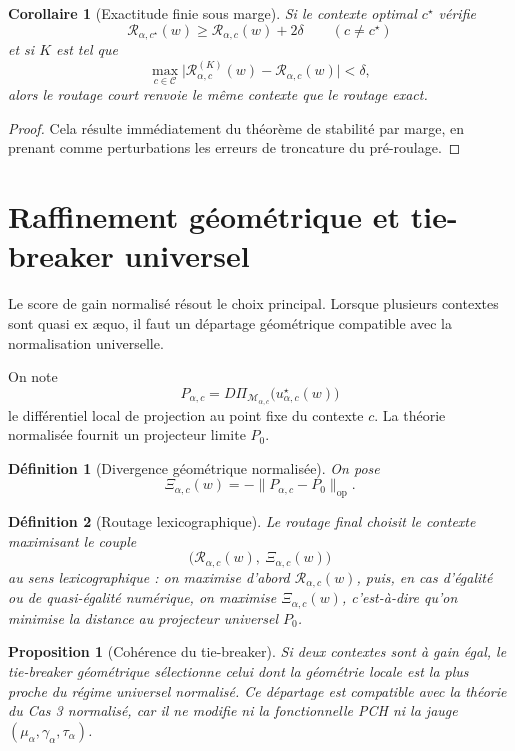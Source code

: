 \documentclass[11pt,a4paper]{article}
\newtheorem{definition}{Définition}[section]
\newtheorem{proposition}{Proposition}[section]
\newtheorem{corollary}{Corollaire}[section]
\DeclareMathOperator{\op}{op}
\newcommand{\Mcal}{\mathcal M}
\newcommand{\Ccal}{\mathcal C}
\begin{document}
\begin{corollary}[Exactitude finie sous marge]
\label{cor:finite-exactness}
Si le contexte optimal \(c^\star\) vérifie
\[
\mathcal R_{\alpha,c^\star}(w)\ge \mathcal R_{\alpha,c}(w)+2\delta
\qquad(c\neq c^\star)
\]
et si \(K\) est tel que
\[
\max_{c\in\Ccal}\bigl|\mathcal R^{(K)}_{\alpha,c}(w)-\mathcal R_{\alpha,c}(w)\bigr|<\delta,
\]
alors le routage court renvoie le même contexte que le routage exact.
\end{corollary}

\begin{proof}
Cela résulte immédiatement du théorème de stabilité par marge, en prenant comme perturbations les erreurs de troncature du pré-roulage.
\end{proof}

\section{Raffinement géométrique et tie-breaker universel}

Le score de gain normalisé résout le choix principal.
Lorsque plusieurs contextes sont quasi ex æquo, il faut un départage géométrique compatible avec la normalisation universelle.

On note
\[
P_{\alpha,c}
=
D\Pi_{\Mcal_{\alpha,c}}\bigl(u^\star_{\alpha,c}(w)\bigr)
\]
le différentiel local de projection au point fixe du contexte \(c\).
La théorie normalisée fournit un projecteur limite \(P_0\).

\begin{definition}[Divergence géométrique normalisée]
On pose
\[
\Xi_{\alpha,c}(w)
=
-\bigl\|P_{\alpha,c}-P_0\bigr\|_{\op}.
\]
\end{definition}

\begin{definition}[Routage lexicographique]
Le routage final choisit le contexte maximisant le couple
\[
\bigl(\mathcal R_{\alpha,c}(w),\ \Xi_{\alpha,c}(w)\bigr)
\]
au sens lexicographique :
on maximise d'abord \(\mathcal R_{\alpha,c}(w)\), puis, en cas d'égalité ou de quasi-égalité numérique, on maximise \(\Xi_{\alpha,c}(w)\), c'est-à-dire qu'on minimise la distance au projecteur universel \(P_0\).
\end{definition}

\begin{proposition}[Cohérence du tie-breaker]
Si deux contextes sont à gain égal, le tie-breaker géométrique sélectionne celui dont la géométrie locale est la plus proche du régime universel normalisé.
Ce départage est compatible avec la théorie du Cas 3 normalisé, car il ne modifie ni la fonctionnelle PCH ni la jauge \((\mu_\alpha,\gamma_\alpha,\tau_\alpha)\).
\end{proposition}
\end{document}
